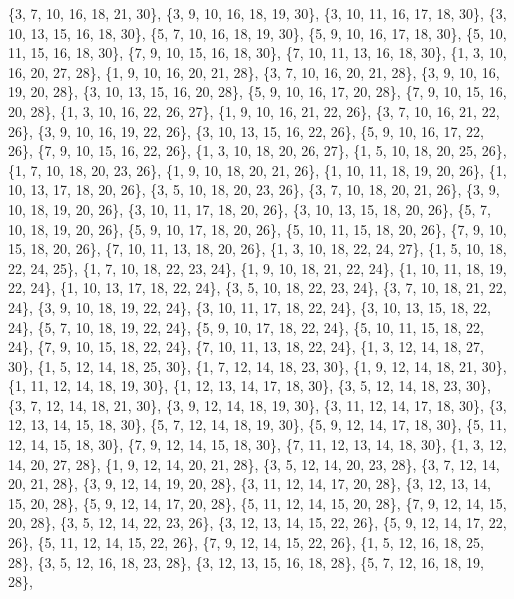 \documentclass[11pt,a4paper]{article}
\begin{document}
{\{3, 7, 10, 16, 18, 21, 30\}, \{3, 9, 10, 16, 18, 19, 30\}, \{3, 10, 11, 16, 17, 18, 30\}, \{3, 10, 13, 15, 16, 18, 30\}, \{5, 7, 10, 16, 18, 19, 30\},
\{5, 9, 10, 16, 17, 18, 30\}, \{5, 10, 11, 15, 16, 18, 30\}, \{7, 9, 10, 15, 16, 18, 30\}, \{7, 10, 11, 13, 16, 18, 30\}, \{1, 3, 10, 16, 20, 27, 28\},
\{1, 9, 10, 16, 20, 21, 28\}, \{3, 7, 10, 16, 20, 21, 28\}, \{3, 9, 10, 16, 19, 20, 28\}, \{3, 10, 13, 15, 16, 20, 28\}, \{5, 9, 10, 16, 17, 20, 28\},
\{7, 9, 10, 15, 16, 20, 28\}, \{1, 3, 10, 16, 22, 26, 27\}, \{1, 9, 10, 16, 21, 22, 26\}, \{3, 7, 10, 16, 21, 22, 26\}, \{3, 9, 10, 16, 19, 22, 26\},
\{3, 10, 13, 15, 16, 22, 26\}, \{5, 9, 10, 16, 17, 22, 26\}, \{7, 9, 10, 15, 16, 22, 26\}, \{1, 3, 10, 18, 20, 26, 27\}, \{1, 5, 10, 18, 20, 25, 26\},
\{1, 7, 10, 18, 20, 23, 26\}, \{1, 9, 10, 18, 20, 21, 26\}, \{1, 10, 11, 18, 19, 20, 26\}, \{1, 10, 13, 17, 18, 20, 26\}, \{3, 5, 10, 18, 20, 23, 26\},
\{3, 7, 10, 18, 20, 21, 26\}, \{3, 9, 10, 18, 19, 20, 26\}, \{3, 10, 11, 17, 18, 20, 26\}, \{3, 10, 13, 15, 18, 20, 26\}, \{5, 7, 10, 18, 19, 20, 26\},
\{5, 9, 10, 17, 18, 20, 26\}, \{5, 10, 11, 15, 18, 20, 26\}, \{7, 9, 10, 15, 18, 20, 26\}, \{7, 10, 11, 13, 18, 20, 26\}, \{1, 3, 10, 18, 22, 24, 27\},
\{1, 5, 10, 18, 22, 24, 25\}, \{1, 7, 10, 18, 22, 23, 24\}, \{1, 9, 10, 18, 21, 22, 24\}, \{1, 10, 11, 18, 19, 22, 24\}, \{1, 10, 13, 17, 18, 22, 24\},
\{3, 5, 10, 18, 22, 23, 24\}, \{3, 7, 10, 18, 21, 22, 24\}, \{3, 9, 10, 18, 19, 22, 24\}, \{3, 10, 11, 17, 18, 22, 24\}, \{3, 10, 13, 15, 18, 22, 24\},
\{5, 7, 10, 18, 19, 22, 24\}, \{5, 9, 10, 17, 18, 22, 24\}, \{5, 10, 11, 15, 18, 22, 24\}, \{7, 9, 10, 15, 18, 22, 24\}, \{7, 10, 11, 13, 18, 22, 24\},
\{1, 3, 12, 14, 18, 27, 30\}, \{1, 5, 12, 14, 18, 25, 30\}, \{1, 7, 12, 14, 18, 23, 30\}, \{1, 9, 12, 14, 18, 21, 30\}, \{1, 11, 12, 14, 18, 19, 30\},
\{1, 12, 13, 14, 17, 18, 30\}, \{3, 5, 12, 14, 18, 23, 30\}, \{3, 7, 12, 14, 18, 21, 30\}, \{3, 9, 12, 14, 18, 19, 30\}, \{3, 11, 12, 14, 17, 18, 30\},
\{3, 12, 13, 14, 15, 18, 30\}, \{5, 7, 12, 14, 18, 19, 30\}, \{5, 9, 12, 14, 17, 18, 30\}, \{5, 11, 12, 14, 15, 18, 30\}, \{7, 9, 12, 14, 15, 18, 30\},
\{7, 11, 12, 13, 14, 18, 30\}, \{1, 3, 12, 14, 20, 27, 28\}, \{1, 9, 12, 14, 20, 21, 28\}, \{3, 5, 12, 14, 20, 23, 28\}, \{3, 7, 12, 14, 20, 21, 28\},
\{3, 9, 12, 14, 19, 20, 28\}, \{3, 11, 12, 14, 17, 20, 28\}, \{3, 12, 13, 14, 15, 20, 28\}, \{5, 9, 12, 14, 17, 20, 28\}, \{5, 11, 12, 14, 15, 20, 28\},
\{7, 9, 12, 14, 15, 20, 28\}, \{3, 5, 12, 14, 22, 23, 26\}, \{3, 12, 13, 14, 15, 22, 26\}, \{5, 9, 12, 14, 17, 22, 26\}, \{5, 11, 12, 14, 15, 22, 26\},
\{7, 9, 12, 14, 15, 22, 26\}, \{1, 5, 12, 16, 18, 25, 28\}, \{3, 5, 12, 16, 18, 23, 28\}, \{3, 12, 13, 15, 16, 18, 28\}, \{5, 7, 12, 16, 18, 19, 28\},
}
\end{document}
